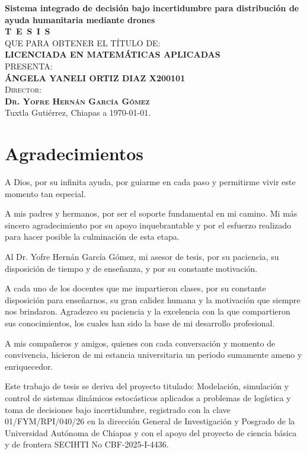 \begin{titlepage}
\begin{minipage}[t][0.95\textheight][c]{0.76\textwidth}
            \begin{center}
                {\Large\bfseries Sistema integrado de decisión bajo incertidumbre para distribución de ayuda humanitaria mediante drones}\\[2cm]
                \textsc{\huge \textbf{T\, E\, S\, I\, S}}\\[1.5cm]
                \textsc{\large QUE PARA OBTENER EL TÍTULO DE:}\\[0.3cm]
                \textbf{\textsc{LICENCIADA EN MATEMÁTICAS APLICADAS}}\\[1.5cm]
                \textsc{\large PRESENTA:}\\[0.3cm]
                \textbf{\textsc{\large {ÁNGELA YANELI ORTIZ DIAZ X200101}}}\\[2cm]
                {\large\scshape Director:\\[0.3cm]
                {\textbf{\large Dr. Yofre Hernán García Gómez }}}\\[2.0cm]
                \large{Tuxtla Gutiérrez, Chiapas a \today.}

            \end{center}
\end{minipage}
\end{titlepage}

\pagebreak[2]

\chapter*{Agradecimientos}

A Dios, por su infinita ayuda, por guiarme en cada paso y permitirme vivir este momento tan especial.

A mis padres y hermanos, por ser el soporte fundamental en mi camino. Mi más sincero agradecimiento por su apoyo inquebrantable y por el esfuerzo realizado para hacer posible la culminación de esta etapa.

Al Dr. Yofre Hernán García Gómez, mi asesor de tesis, por su paciencia, su disposición de tiempo y de enseñanza, y por su constante motivación.

A cada uno de los docentes que me impartieron clases, por su constante disposición para enseñarnos, su gran calidez humana y la motivación que siempre nos brindaron. Agradezco su paciencia y la excelencia con la que compartieron sus conocimientos, los cuales han sido la base de mi desarrollo profesional.

A mis compañeros y amigos, quienes con cada conversación y momento de convivencia, hicieron de mi estancia universitaria un periodo sumamente ameno y enriquecedor.


Este trabajo de tesis se deriva del proyecto titulado: Modelación, simulación y control de sistemas dinámicos estocásticos aplicados a problemas de logística  y toma de decisiones bajo incertidumbre, registrado con la clave 01/FYM/RPI/040/26 en la dirección General de Investigación y Posgrado de la Universidad Autónoma de Chiapas y con el apoyo del proyecto de ciencia básica y de frontera SECIHTI No CBF-2025-I-4436.



